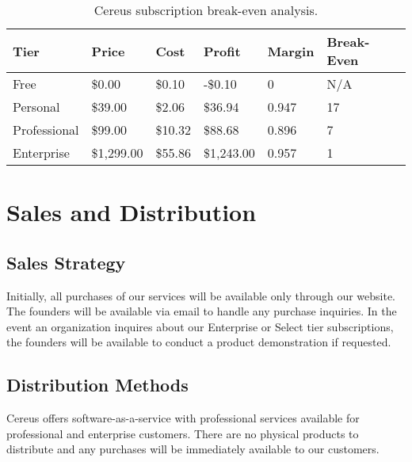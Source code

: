 \begin{table}[H]
  \centering
  \begin{tabularx}{\textwidth}{|X|X|X|X|X|X|}
    Tier & Price & Cost & Profit & Margin & Break-Even \\
  
    \hline
  
    Free & \$0.00 & \$0.10 & -\$0.10 & 0 & N/A \\

    \hline
  
    Personal & \$39.00 & \$2.06 & \$36.94 & 0.947 & 17 \\ 

    \hline
  
    Professional & \$99.00 & \$10.32 & \$88.68 & 0.896 & 7 \\ 

    \hline

    Enterprise & \$1,299.00 & \$55.86 & \$1,243.00 & 0.957 & 1 \\ 

  \end{tabularx}
  \caption{Cereus subscription break-even analysis.}
  \label{table.cereus.breakeven}
\end{table}


\section{Sales and Distribution}

\subsection{Sales Strategy}

Initially, all purchases of our services will be available only through our website. The founders will be available via email to handle any purchase inquiries. In the event an organization inquires about our Enterprise or Select tier subscriptions, the founders will be available to conduct a product demonstration if requested.

\subsection{Distribution Methods}

Cereus offers software-as-a-service with professional services available for professional and enterprise customers. There are no physical products to distribute and any purchases will be immediately available to our customers.

